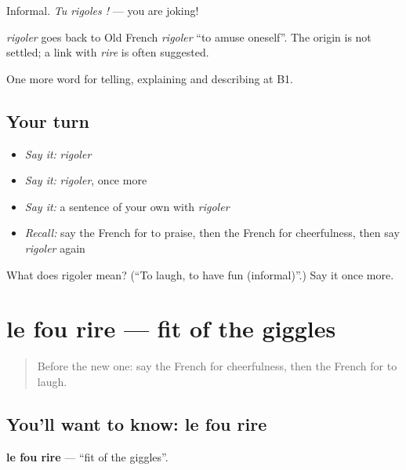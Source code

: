 Informal. \emph{Tu rigoles !} — you are joking!

\begin{cousinweb}
\emph{rigoler} goes back to Old French \emph{rigoler} \textquotedblleft{}to amuse oneself\textquotedblright{}. The origin is not settled; a link with \emph{rire} is often suggested.
\end{cousinweb}

\begin{grammarlens}[title={What you've built}]
One more word for telling, explaining and describing at B1.
\end{grammarlens}

\subsection*{Your turn}
\begin{itemize}
\raggedright
  \item \emph{Say it:} \emph{rigoler}
  \item \emph{Say it:} \emph{rigoler}, once more
  \item \emph{Say it:} a sentence of your own with \emph{rigoler}
  \item \emph{Recall:} say the French for to praise, then the French for cheerfulness, then say \emph{rigoler} again
\end{itemize}

\begin{tcolorbox}[breakable,colback=teal!4,colframe=teal!35!black,title={Before you move on}]
What does rigoler mean? (\textquotedblleft{}To laugh, to have fun (informal)\textquotedblright{}.) Say it once more.
\end{tcolorbox}
\section[le fou rire]{le fou rire — fit of the giggles}

\label{lesson:FR-C474-fou-rire}



\begin{quote}
Before the new one: say the French for cheerfulness, then the French for to laugh.
\end{quote}

\subsection*{You'll want to know: le fou rire}
\textbf{le fou rire} — \textquotedblleft{}fit of the giggles\textquotedblright{}.

